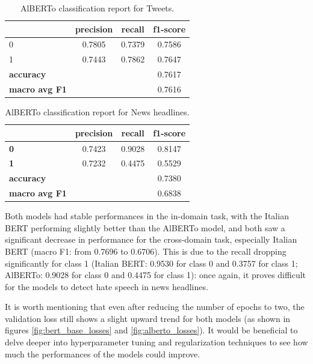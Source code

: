 \begin{table}[h]
    \centering
    \small
    \begin{tabular}{lccc}
        \toprule
        & \textbf{precision} & \textbf{recall} & \textbf{f1-score} \\
        \midrule
        0 & 0.7805 & 0.7379 & 0.7586 \\
        1 & 0.7443 & 0.7862 & 0.7647 \\
        \midrule
        \textbf{accuracy} & & & 0.7617 \\
        \textbf{macro avg F1} & & & 0.7616 \\
        \bottomrule
    \end{tabular}
    \caption{AlBERTo classification report for Tweets.}
    \label{tab:classification_report_alberto_tweets}
\end{table}

\begin{table}[h]
    \centering
    \small
    \begin{tabular}{lccc}
        \toprule
     & \textbf{precision} & \textbf{recall} & \textbf{f1-score} \\
        \midrule
        \textbf{0}          & 0.7423  & 0.9028 & 0.8147  \\
        \textbf{1}          & 0.7232  & 0.4475 & 0.5529  \\
        \midrule
        \textbf{accuracy}   &         &        & 0.7380  \\
        \textbf{macro avg F1}  &   &  & 0.6838  \\
        \bottomrule
    \end{tabular}
    \caption{AlBERTo classification report for News headlines.}
    \label{tab:classification_report_alberto_news}
\end{table}

Both models had stable performances in the in-domain task, with the Italian BERT performing slightly better than the AlBERTo model, and both saw a significant decrease in performance for the cross-domain task, especially Italian BERT (macro F1: from 0.7696 to 0.6706). This is due to the recall dropping significantly for class 1 (Italian BERT: 0.9530 for class 0 and 0.3757 for class 1; AlBERTo: 0.9028 for class 0 and 0.4475 for class 1): once again, it proves difficult for the models to detect hate speech in news headlines.

It is worth mentioning that even after reducing the number of epochs to two, the validation loss still shows a slight upward trend for both models (as shown in figures \ref{fig:bert_base_losses} and \ref{fig:alberto_losses}). It would be beneficial to delve deeper into hyperparameter tuning and regularization techniques to see how much the performances of the models could improve.

